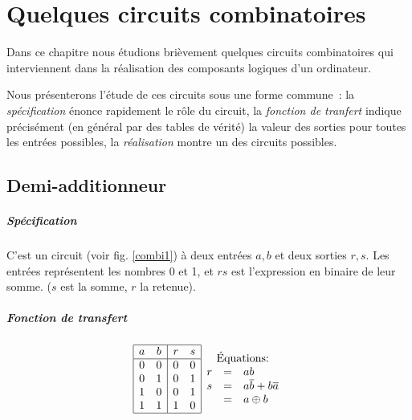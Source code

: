 \chapter{Quelques circuits combinatoires}

Dans ce chapitre nous \'etudions bri\`evement quelques circuits
combinatoires qui interviennent dans la r\'ealisation des 
composants logiques d'un ordinateur.

Nous pr\'esenterons l'\'etude de ces circuits sous une forme commune~:
la {\em sp\'ecification} \'enonce rapidement le r\^ole du circuit, la
{\em fonction de tranfert} indique pr\'ecis\'ement (en général par des
tables de v\'erit\'e) la valeur des sorties pour toutes les entr\'ees
possibles, la {\em r\'ealisation} montre un des circuits possibles.

\section{Demi-additionneur}

\paragraph{Sp\'ecification} 
C'est un circuit (voir fig. \ref{combi1}) \`a deux entr\'ees $a, b$ et
deux sorties $r, s$.  Les entr\'ees repr\'esentent les nombres 0 et 1,
et $rs$ est l'expression en binaire de leur somme. ($s$ est la somme,
$r$ la retenue).



\paragraph{Fonction de transfert} 
$$
\begin{array}{|cc|cc|}
\hline
	a& b&	r & s\\
\hline
	0 & 0 &	0 & 0 \\
	0 & 1 &	0 & 1 \\
	1 & 0 &	0 & 1 \\
	1 & 1 &	1 & 0 \\
\hline
\end{array}
\begin{array}{rcl}
\multicolumn{3}{c}{\mbox{Équations:}} \\
r &=& a b \\
 s &=& a\overline{b} + b\overline{a} \\
	&=& a \oplus b
\end{array}
$$

